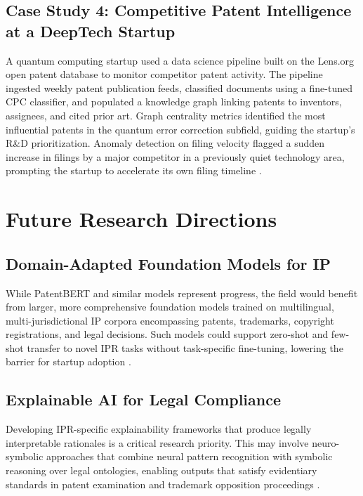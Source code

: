\documentclass[conference]{IEEEtran}
\begin{document}
\subsection{Case Study 4: Competitive Patent Intelligence at a DeepTech Startup}

A quantum computing startup used a data science pipeline built on the Lens.org open patent database to monitor competitor patent activity. The pipeline ingested weekly patent publication feeds, classified documents using a fine-tuned CPC classifier, and populated a knowledge graph linking patents to inventors, assignees, and cited prior art. Graph centrality metrics identified the most influential patents in the quantum error correction subfield, guiding the startup's R\&D prioritization. Anomaly detection on filing velocity flagged a sudden increase in filings by a major competitor in a previously quiet technology area, prompting the startup to accelerate its own filing timeline \cite{ref26}.

\section{Future Research Directions}

\subsection{Domain-Adapted Foundation Models for IP}

While PatentBERT and similar models represent progress, the field would benefit from larger, more comprehensive foundation models trained on multilingual, multi-jurisdictional IP corpora encompassing patents, trademarks, copyright registrations, and legal decisions. Such models could support zero-shot and few-shot transfer to novel IPR tasks without task-specific fine-tuning, lowering the barrier for startup adoption \cite{ref36}.

\subsection{Explainable AI for Legal Compliance}

Developing IPR-specific explainability frameworks that produce legally interpretable rationales is a critical research priority. This may involve neuro-symbolic approaches that combine neural pattern recognition with symbolic reasoning over legal ontologies, enabling outputs that satisfy evidentiary standards in patent examination and trademark opposition proceedings \cite{ref38}.
\end{document}
